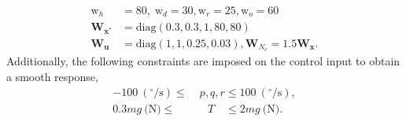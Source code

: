 \documentclass[letterpaper, 10 pt, conference]{ieeeconf}  %
\begin{document}
%
\begin{align*}
    \mathrm{w}_h &= 80, \; \mathrm{w}_d = 30, \mathrm{w}_r = 25, \mathrm{w}_o = 60\\ 
	\mathbf{W}_{\mathbf{x}^{\textrm{*}}} &= \textrm{diag}(0.3,0.3,1,80,80) \\
	\mathbf{W}_{\mathbf{u}} &= \textrm{diag}(1,1,0.25,0.03), \mathbf{W}_{N_c} =1.5\mathbf{W}_{\mathbf{x}}.
\end{align*}
%
Additionally, the following constraints are imposed on the control input to obtain a smooth response,
%
\begin{align} 
    -100\ (^{\circ}/\textrm{s}) \leq & \; p, q, r \leq 100\ (^{\circ}/\textrm{s}), \label{eq:const_rates} \\
    0.3mg\ \text{(N)} \leq & \quad T \quad \leq 2mg\ \text{(N)}. \label{eq:constT}
\end{align}
%

\end{document}

